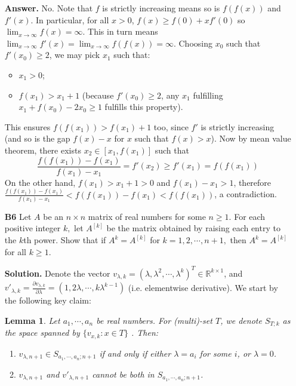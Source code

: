 \documentclass[11pt,a4paper]{article}
\newcommand{\<}{\langle}
\renewcommand{\>}{\rangle}
\newtheorem{lemma}{Lemma}
\begin{document}
\begin{enumerate}
    \textbf{Answer.} No. 
    Note that $f$ is strictly increasing means so is $f(f(x))$ and $f'(x)$. In particular, for all $x > 0$, 
    $f(x)\ge f(0)+xf'(0)$ so $\lim_{x\to\infty} f(x)=\infty$. This in turn means $\lim_{x\to\infty} f'(x)=\lim_{x\to\infty} f(f(x))=\infty$. 
    Choosing $x_0$ such that $f'(x_0)\ge 2$, we may pick $x_1$ such that: 
    \begin{itemize}
    	\item $x_1 > 0$; 
    	
    	\item $f(x_1) > x_1 + 1$ (because $f'(x_0)\ge 2$, any $x_1$ fulfilling $x_1 + f(x_0)-2x_0\ge 1$ fulfills this property). 
    \end{itemize}
    This ensures $f(f(x_1)) > f(x_1)+1$ too, since $f'$ is strictly increasing (and so is the gap $f(x)-x$ for $x$ such that $f(x) > x$). 
    Now by mean value theorem, there exists $x_2\in [x_1, f(x_1)]$ such that 
    \[
    \frac{f(f(x_1))-f(x_1)}{f(x_1)-x_1}
    =f'(x_2)\ge f'(x_1)=f(f(x_1))
    \]
    On the other hand, $f(x_1) > x_1+1 > 0$ and $f(x_1)-x_1 > 1$, therefore 
    $\frac{f(f(x_1))-f(x_1)}{f(x_1)-x_1} < f(f(x_1))-f(x_1) < f(f(x_1))$, a contradiction. 
    
    \item [\textbf{B6}]
    Let $A$ be an $n\times n$ matrix of real numbers for some $n\ge 1.$ For each positive integer $k,$ let $A^{[k]}$ be the matrix obtained by raising each entry to the $k$th power. Show that if $A^k=A^{[k]}$ for $k=1,2,\cdots,n+1,$ then $A^k=A^{[k]}$ for all $k\ge 1.$
    
    \textbf{Solution.} 
    Denote the vector $v_{\lambda, k}=(\lambda, \lambda^2, \cdots, \lambda^k)^T\in\mathbb{R}^{k\times 1}$, 
    and $v'_{\lambda, k} = \frac{\partial v_{\lambda, k}}{\partial \lambda} = (1, 2\lambda, \cdots, k\lambda^{k-1})$ 
    (i.e. elementwise derivative). 
    We start by the following key claim: 
    \begin{lemma}
    	Let $a_1, \cdots, a_n$ be real numbers. For (multi)-set $T$, we denote $S_{T; k}$ as the space spanned by $\{v_{x, k}: x\in T\}$ . 
    	Then: 
    	\begin{enumerate}
    		\item $v_{\lambda, n + 1}\in S_{a_1, \cdots, a_n; n + 1}$ if and only if either $\lambda=a_i$ for some $i$, or $\lambda=0$. 
    		
    		\item $v_{\lambda, n + 1}$ and $v'_{\lambda, n + 1}$ cannot be both in $S_{a_1, \cdots, a_n; n + 1}$. 
    		

\end{enumerate}
\end{lemma}
\end{enumerate}
\end{document}
